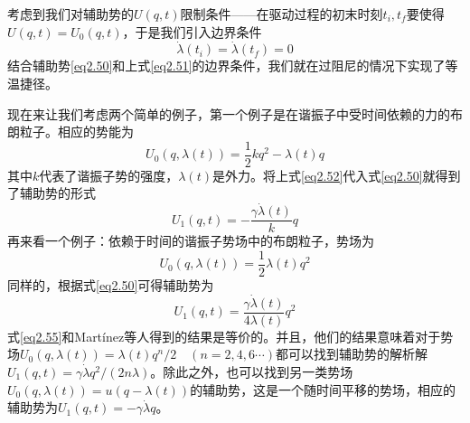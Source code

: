 考虑到我们对辅助势的$U(q,t)$限制条件——在驱动过程的初末时刻$t_i , t_f$要使得$U(q,t)=U_0 (q,t)$，于是我们引入边界条件
\begin{equation}
    \dot{\lambda}(t_i)=\dot{\lambda}(t_f)=0
    \label{eq2.51}
\end{equation}
结合辅助势\eqref{eq2.50}和上式\eqref{eq2.51}的边界条件，我们就在过阻尼的情况下实现了等温捷径。

现在来让我们考虑两个简单的例子，第一个例子是在谐振子中受时间依赖的力的布朗粒子。相应的势能为
\begin{equation}
    U_{0}(q, \lambda(t))=\frac{1}{2} k q^{2}-\lambda(t) q
    \label{eq2.52}
\end{equation}
其中$k$代表了谐振子势的强度，$\lambda(t)$是外力。将上式\eqref{eq2.52}代入式\eqref{eq2.50}就得到了辅助势的形式
\begin{equation}
    U_{1}(q, t)=-\frac{\gamma \dot{\lambda}(t)}{k} q
    \label{eq2.53}
\end{equation}
再来看一个例子：依赖于时间的谐振子势场中的布朗粒子，势场为
\begin{equation}
    U_{0}(q, \lambda(t))=\frac{1}{2} \lambda(t) q^{2}
    \label{eq2.54}
\end{equation}
同样的，根据式\eqref{eq2.50}可得辅助势为
\begin{equation}
    U_{1}(q, t)=\frac{\gamma \dot{\lambda}(t)}{4 \lambda(t)} q^{2}
    \label{eq2.55}
\end{equation}
式\eqref{eq2.55}和Martínez等人得到的结果\cite{Martinez2016}是等价的。并且，他们的结果意味着对于势场$U_0 (q, \lambda(t))= \lambda(t) q^{n} / 2 \quad (n=2,4,6\cdots)$都可以找到辅助势的解析解$U_{1}(q, t)=\gamma \dot{\lambda} q^{2} /(2 n \lambda)$。除此之外，也可以找到另一类势场$U_{0}(q, \lambda(t))=u(q-\lambda(t))$的辅助势\cite{Li2016}，这是一个随时间平移的势场，相应的辅助势为$U_{1}(q, t)=-\gamma \dot{\lambda} q$。


